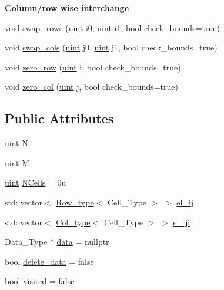 \begin{Indent}\textbf{ Column/row wise interchange}\par
\begin{DoxyCompactItemize}
\item 
void \hyperlink{class_b_array_a742773803481c18e2865b2b2a1e68949}{swap\+\_\+rows} (\hyperlink{typedefs_8hpp_a91ad9478d81a7aaf2593e8d9c3d06a14}{uint} i0, \hyperlink{typedefs_8hpp_a91ad9478d81a7aaf2593e8d9c3d06a14}{uint} i1, bool check\+\_\+bounds=true)
\item 
void \hyperlink{class_b_array_ae94f7e61ca5985244968d9daf2859229}{swap\+\_\+cols} (\hyperlink{typedefs_8hpp_a91ad9478d81a7aaf2593e8d9c3d06a14}{uint} j0, \hyperlink{typedefs_8hpp_a91ad9478d81a7aaf2593e8d9c3d06a14}{uint} j1, bool check\+\_\+bounds=true)
\item 
void \hyperlink{class_b_array_a411085fcb7530669c72d9847340f1bac}{zero\+\_\+row} (\hyperlink{typedefs_8hpp_a91ad9478d81a7aaf2593e8d9c3d06a14}{uint} i, bool check\+\_\+bounds=true)
\item 
void \hyperlink{class_b_array_a0fa473027d00ec53ed08eaea03ac3ef7}{zero\+\_\+col} (\hyperlink{typedefs_8hpp_a91ad9478d81a7aaf2593e8d9c3d06a14}{uint} j, bool check\+\_\+bounds=true)
\end{DoxyCompactItemize}
\end{Indent}
\subsection*{Public Attributes}
\begin{DoxyCompactItemize}
\item 
\hyperlink{typedefs_8hpp_a91ad9478d81a7aaf2593e8d9c3d06a14}{uint} \hyperlink{class_b_array_a4b34ec8636c989efe80bbe3f1cea217e}{N}
\item 
\hyperlink{typedefs_8hpp_a91ad9478d81a7aaf2593e8d9c3d06a14}{uint} \hyperlink{class_b_array_a197359753fd1bc054a1a14f7641d3fd1}{M}
\item 
\hyperlink{typedefs_8hpp_a91ad9478d81a7aaf2593e8d9c3d06a14}{uint} \hyperlink{class_b_array_a31fd64c6b54408ca98e07abc9c4241c5}{N\+Cells} = 0u
\item 
std\+::vector$<$ \hyperlink{typedefs_8hpp_a4deca4f3fb25a4da374818ab459b8b4a}{Row\+\_\+type}$<$ Cell\+\_\+\+Type $>$ $>$ \hyperlink{class_b_array_a2161dc7c2046a57d3e663ac5c0d70431}{el\+\_\+ij}
\item 
std\+::vector$<$ \hyperlink{typedefs_8hpp_a3bb95a7612ee928fba42f33a96adb3eb}{Col\+\_\+type}$<$ Cell\+\_\+\+Type $>$ $>$ \hyperlink{class_b_array_aad8ce1aa5fddd3899164c1aa1dfede94}{el\+\_\+ji}
\item 
Data\+\_\+\+Type $\ast$ \hyperlink{class_b_array_a9576163b52124021575e50dbcca2f6b9}{data} = nullptr
\item 
bool \hyperlink{class_b_array_a1e932e3353905d77a2062560ee96b2fc}{delete\+\_\+data} = false
\item 
bool \hyperlink{class_b_array_ae0860bf21425397d1498f94da6518e85}{visited} = false
\end{DoxyCompactItemize}
